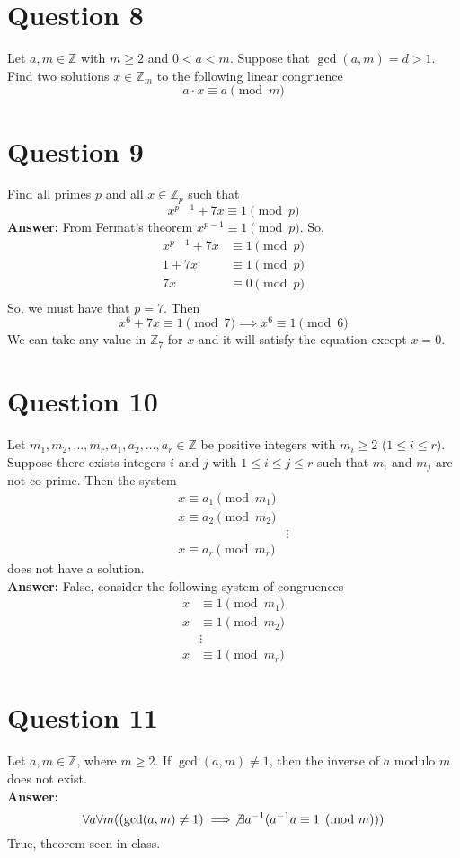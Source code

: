 \documentclass[openany]{report}
\begin{document}
\section{Question 8}
Let $a,m \in \mathbb{Z}$ with $m \geq 2$ and $0 < a < m$. Suppose that $\gcd(a,m) = d > 1$. Find two solutions $x \in \mathbb{Z}_m$ to the following linear congruence 
\[a \cdot x \equiv a \pmod{m}\]
\section{Question 9}
Find all primes $p$ and all $x \in \mathbb{Z}_p$ such that 
\[x^{p-1} + 7x \equiv 1 \pmod{p}\]
\textbf{Answer:}
From Fermat's theorem $x^{p-1} \equiv 1 \pmod{p}$. So, 
\begin{align*}
    x^{p-1} + 7x &\equiv 1 \pmod{p}\\
    1 + 7x &\equiv 1 \pmod{p}\\
    7x &\equiv 0 \pmod{p}\\
\end{align*}
So, we must have that $p = 7$. Then 
\[x^6 + 7x \equiv 1 \pmod{7} \implies x^6 \equiv 1 \pmod{6}\]
We can take any value in $\mathbb{Z}_7$ for $x$ and it will satisfy the equation except $x = 0$. 
\section{Question 10}
Let $m_1, m_2, \ldots, m_r, a_1, a_2, \ldots, a_r \in \mathbb{Z}$ be positive integers with $m_i \geq 2 $ ($1 \leq i \leq r$). Suppose there exists integers $i$ and $j$ with $1 \leq i \leq j \leq r$ such that $m_i$ and $m_j$ are not co-prime. Then the system 
\begin{align*}
    x \equiv a_1 \pmod{m_1} \\
    x \equiv a_2 \pmod{m_2} \\
    &\vdots\\
    x \equiv a_r \pmod{m_r}
\end{align*}
does not have a solution. \\[2ex]
\textbf{Answer:} False, consider the following system of congruences
\begin{align*}
    x &\equiv 1 \pmod{m_1} \\
    x &\equiv 1 \pmod{m_2} \\
    &\vdots\\
    x &\equiv 1 \pmod{m_r}
\end{align*}
\section{Question 11}
Let $a,m \in \mathbb{Z}$, where $m \geq 2$. If $\gcd(a,m) \neq 1$, then the inverse of $a$ modulo $m$ does not exist. \\[2ex]
\textbf{Answer:} 
\[\forall a\forall m((\gcd(a,m) \neq 1) \implies \not\exists a^{-1}(a^{-1}a \equiv 1 \pmod{m}))\]
True, theorem seen in class.
\end{document}
